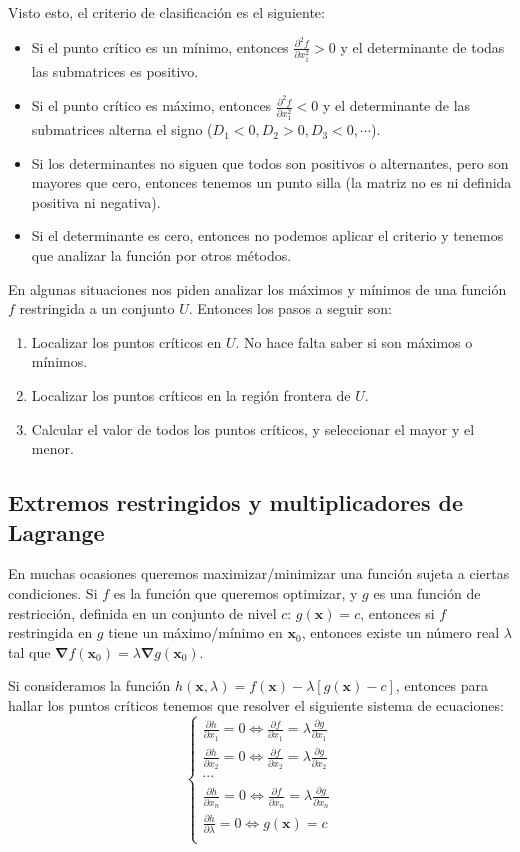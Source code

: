 \documentclass[a4paper]{article}
\begin{document}
Visto esto, el criterio de clasificación es el siguiente:
\begin{itemize}
	\item Si el punto crítico es un mínimo, entonces $\frac{\partial^2 f}{\partial x_1^2} > 0$ y el determinante de todas las submatrices es positivo.
	\item Si el punto crítico es máximo, entonces $\frac{\partial^2 f}{\partial x_1^2} < 0$ y el determinante de las submatrices alterna el signo ($D_1 <0, D_2>0, D_3<0, \cdots$).
	\item Si los determinantes no siguen que todos son positivos o alternantes, pero son mayores que cero, entonces tenemos un punto silla (la matriz no es ni definida positiva ni negativa).
	\item Si el determinante es cero, entonces no podemos aplicar el criterio y tenemos que analizar la función por otros métodos.
\end{itemize}


En algunas situaciones nos piden analizar los máximos y mínimos de una función $f$ restringida a un conjunto $U$. Entonces los pasos a seguir son:
\begin{enumerate}
	\item Localizar los puntos críticos en $U$. No hace falta saber si son máximos o mínimos.
	\item Localizar los puntos críticos en la región frontera de $U$.
	\item Calcular el valor de todos los puntos críticos, y seleccionar el mayor y el menor.
\end{enumerate}

\subsection{Extremos restringidos y multiplicadores de Lagrange}
En muchas ocasiones queremos maximizar/minimizar una función sujeta a ciertas condiciones. Si $f$ es la función que queremos optimizar, y $g$ es una función de restricción, definida en un conjunto de nivel $c$: $g(\textbf{x})  = c$, entonces si $f$ restringida en $g$ tiene un máximo/mínimo en $\textbf{x}_0$, entonces existe un número real $\lambda$ tal que $\boldsymbol{\nabla}f(\textbf{x}_0) = \lambda\boldsymbol{\nabla}g(\textbf{x}_0)$.

Si consideramos la función $h(\textbf{x},\lambda) = f(\textbf{x})- \lambda[g(\textbf{x})-c]$, entonces para hallar los puntos críticos tenemos que resolver el siguiente sistema de ecuaciones:
\[\begin{cases} 
\frac{\partial h}{\partial x_1} = 0 \iff \frac{\partial f}{\partial x_1} = \lambda \frac{\partial g}{\partial x_1}  \\ 
\frac{\partial h}{\partial x_2} = 0 \iff \frac{\partial f}{\partial x_2} = \lambda \frac{\partial g}{\partial x_2}  \\ 
\cdots\\
\frac{\partial h}{\partial x_n} = 0 \iff \frac{\partial f}{\partial x_n} = \lambda \frac{\partial g}{\partial x_n}  \\ 
\frac{\partial h}{\partial \lambda} = 0 \iff g(\textbf{x}) = c  \\ 
\end{cases}\]
\end{document}
